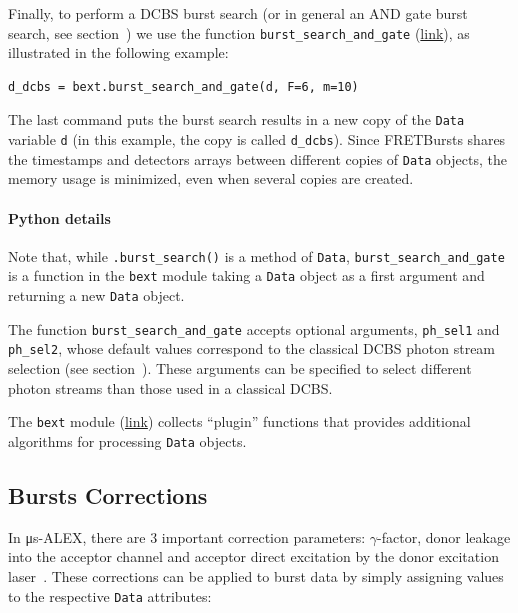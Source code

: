 \documentclass[10pt,letterpaper]{article}
\begin{document}
Finally, to perform a DCBS burst search (or in general an AND gate burst search,
see section~) we use the function
\verb|burst_search_and_gate|
(\href{http://fretbursts.readthedocs.org/en/latest/plugins.html#fretbursts.burstlib_ext.burst_search_and_gate}{link}),
as illustrated in the following example:

\begin{lstlisting}
d_dcbs = bext.burst_search_and_gate(d, F=6, m=10)
\end{lstlisting}

The last command puts the burst search results in a new copy of the \verb|Data| variable \verb|d|
(in this example, the copy is called \verb|d_dcbs|).
Since FRETBursts shares the timestamps and detectors arrays between
different copies of \verb|Data| objects, the memory usage is minimized, even when
several copies are created.

\paragraph*{Python details}
Note that, while \verb|.burst_search()| is a method of \verb|Data|,
\verb|burst_search_and_gate| is a function in the \verb|bext| module
taking a \verb|Data| object as a first argument and returning a new
\verb|Data| object.

The function \verb|burst_search_and_gate| accepts optional arguments,
\verb|ph_sel1| and \verb|ph_sel2|, whose default values correspond to the
classical DCBS photon stream selection (see section~).
These arguments can be specified to select different photon streams than those used in
a classical DCBS.

The \verb|bext| module (\href{http://fretbursts.readthedocs.org/en/latest/plugins.html}{link})
collects ``plugin'' functions that provides additional algorithms
for processing \verb|Data| objects.

\subsection*{Bursts Corrections}
\label{sec:corrcoeff}

In μs-ALEX, there are 3 important correction parameters: $\gamma$-factor,
donor leakage into the acceptor channel
and acceptor direct excitation by the donor excitation laser~\cite{Lee_2005}.
These corrections can be applied to burst data by simply assigning values
to the respective \verb|Data| attributes:
\end{document}
